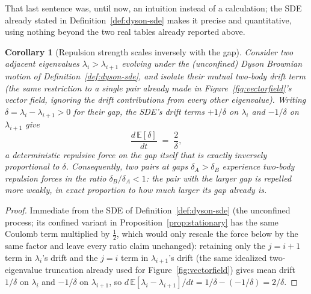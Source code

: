 \documentclass[11pt]{article}
\newtheorem{corollary}{Corollary}
\begin{document}
That last sentence was, until now, an intuition instead of a
calculation; the SDE already stated in Definition~\ref{def:dyson-sde}
makes it precise and quantitative, using nothing beyond the two real
tables already reported above.

\begin{corollary}[Repulsion strength scales inversely with the gap]
\label{cor:weak-repulsion}
Consider two adjacent eigenvalues $\lambda_i>\lambda_{i+1}$ evolving
under the (unconfined) Dyson Brownian motion of
Definition~\ref{def:dyson-sde},
and isolate their mutual two-body drift term (the same restriction to a
single pair already made in Figure~\ref{fig:vectorfield}'s vector
field, ignoring the drift contributions from every other eigenvalue).
Writing $\delta=\lambda_i-\lambda_{i+1}>0$ for their gap, the SDE's
drift terms $+1/\delta$ on $\lambda_i$ and $-1/\delta$ on
$\lambda_{i+1}$ give
\[
\frac{d\,\mathbb E[\delta]}{dt} \;=\; \frac{2}{\delta},
\]
a deterministic repulsive force on the gap itself that is exactly
inversely proportional to $\delta$. Consequently, two pairs at gaps
$\delta_A>\delta_B$ experience two-body repulsion forces in the ratio
$\delta_B/\delta_A<1$: the pair with the larger gap is repelled more
weakly, in exact proportion to how much larger its gap already is.
\end{corollary}
\begin{proof}
Immediate from the SDE of Definition~\ref{def:dyson-sde} (the
unconfined process; its confined variant in
Proposition~\ref{prop:stationary} has the same Coulomb term multiplied
by $\tfrac12$, which would only rescale the force below by the same
factor and leave every ratio claim unchanged):
retaining only the $j=i+1$ term in $\lambda_i$'s drift and the $j=i$
term in $\lambda_{i+1}$'s drift (the same idealized two-eigenvalue
truncation already used for Figure~\ref{fig:vectorfield}) gives mean
drift $1/\delta$ on $\lambda_i$ and $-1/\delta$ on $\lambda_{i+1}$, so
$d\,\mathbb E[\lambda_i-\lambda_{i+1}]/dt=1/\delta-(-1/\delta)=2/\delta$.
\end{proof}
\end{document}

